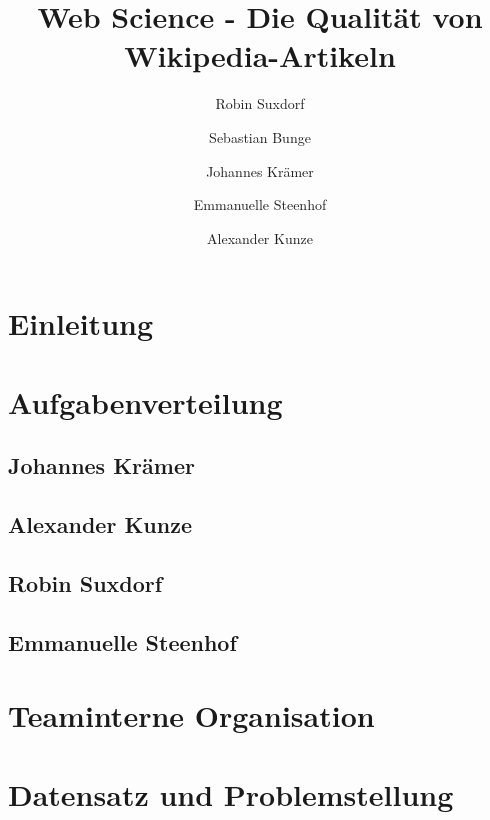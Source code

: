\documentclass[researchlab,palatino]{AIGpaper}
\author{Robin Suxdorf \and Sebastian Bunge \and Johannes Kr\"amer \and Emmanuelle Steenhof \and Alexander Kunze}
\title{Web Science - Die Qualit\"at von Wikipedia-Artikeln}
\begin{document}
\maketitle %


\section{Einleitung}


\section{Aufgabenverteilung}
\label{Aufgabenverteilung}




\subsection{Johannes Kr\"amer}


\subsection{Alexander Kunze}


\subsection{Robin Suxdorf}


\subsection{Emmanuelle Steenhof}


\section{Teaminterne Organisation}
\label{Organisation}



\section{Datensatz und Problemstellung}
\label{Datensatz}

\end{document}
